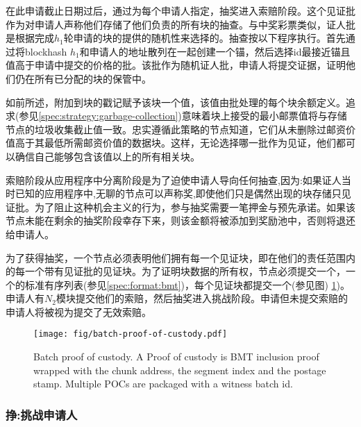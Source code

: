 在此申请截止日期过后，通过为每个申请人指定，抽奖进入索赔阶段。这个见证批作为对申请人声称他们存储了他们负责的所有块的抽查。与中奖彩票类似，证人批是根据完成$h_1$轮申请的块的提供的随机性来选择的。抽查按以下程序执行。首先通过将blockhash $h_1$和申请人的地址散列在一起创建一个锚，然后选择id最接近锚且值高于申请中提交的价格的批。该批作为随机证人批，申请人将提交证据，证明他们仍在所有已分配的块的保管中。 

如前所述，附加到块的戳记赋予该块一个值，该值由批处理的每个块余额定义。追求(参见\ref{spec:strategy:garbage-collection})意味着块上接受的最小邮票值将与存储节点的垃圾收集截止值一致。忠实遵循此策略的节点知道，它们从未删除过邮资价值高于其最低所需邮资价值的数据块。这样，无论选择哪一批作为见证，他们都可以确信自己能够包含该值以上的所有相关块。

索赔阶段从应用程序中分离阶段是为了迫使申请人导向任何抽查,因为:如果证人当时已知的应用程序中,无聊的节点可以声称奖,即使他们只是偶然出现的块存储只见证批。为了阻止这种机会主义的行为，参与抽奖需要一笔押金与预先承诺。如果该节点未能在剩余的抽奖阶段幸存下来，则该金额将被添加到奖励池中，否则将退还给申请人。

为了获得抽奖，一个节点必须表明他们拥有每一个见证块，即在他们的责任范围内的每一个带有见证批的见证块。为了证明块数据的所有权，节点必须提交一个，一个的标准有序列表(参见\ref{spec:format:bmt})，每个见证块都提交一个(参见图) 
\ref{fig:batch-proof-of-custody})。申请人有$N_2$模块提交他们的索赔，然后抽奖进入挑战阶段。申请但未提交索赔的申请人将被视为提交了无效索赔。   


\begin{figure}[htbp]
  \centering
   \texttt{[image: fig/batch-proof-of-custody.pdf]}
  \caption[Batch proof of custody \statusgreen]{Batch proof of custody. A Proof of custody is BMT inclusion proof wrapped with the chunk address, the segment index and the postage stamp. Multiple POCs are packaged with a witness batch id.}
  \label{fig:batch-proof-of-custody}
\end{figure}

\subsubsection{挣:挑战申请人}


